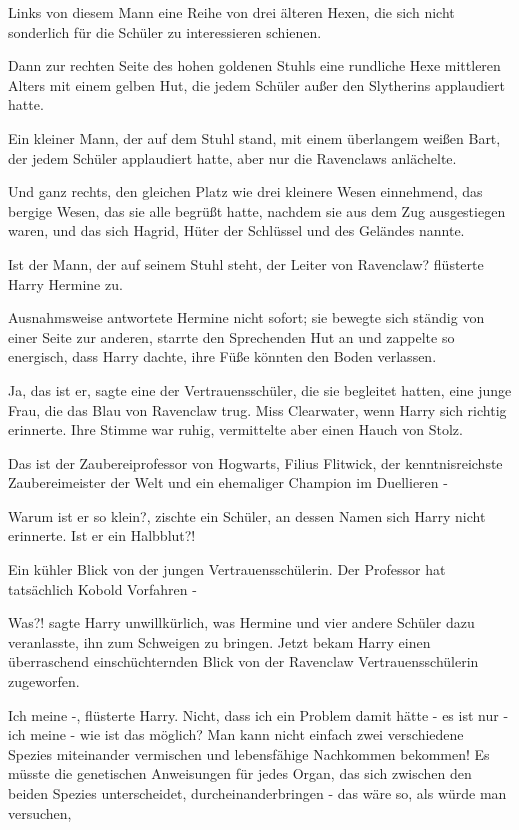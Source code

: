 Links von diesem Mann eine Reihe von drei älteren Hexen, die sich nicht
sonderlich für die Schüler zu interessieren schienen.

Dann zur rechten Seite des hohen goldenen Stuhls eine rundliche Hexe mittleren
Alters mit einem gelben Hut, die jedem Schüler außer den Slytherins applaudiert
hatte.

Ein kleiner Mann, der auf dem Stuhl stand, mit einem überlangem weißen Bart, der
jedem Schüler applaudiert hatte, aber nur die Ravenclaws anlächelte.

Und ganz rechts, den gleichen Platz wie drei kleinere Wesen einnehmend, das
bergige Wesen, das sie alle begrüßt hatte, nachdem sie aus dem Zug ausgestiegen
waren, und das sich Hagrid, Hüter der Schlüssel und des Geländes nannte.

\glqq{}Ist der Mann, der auf seinem Stuhl steht, der Leiter von Ravenclaw?\grqq{}
flüsterte Harry Hermine zu.

Ausnahmsweise antwortete Hermine nicht sofort; sie bewegte sich ständig von
einer Seite zur anderen, starrte den Sprechenden Hut an und zappelte so
energisch, dass Harry dachte, ihre Füße könnten den Boden verlassen.

\glqq{}Ja, das ist er\grqq{}, sagte eine der Vertrauensschüler, die sie
begleitet hatten, eine junge Frau, die das Blau von Ravenclaw trug. Miss
Clearwater, wenn Harry sich richtig erinnerte. Ihre Stimme war ruhig,
vermittelte aber einen Hauch von Stolz.

\glqq{}Das ist der Zaubereiprofessor von Hogwarts, Filius Flitwick, der
kenntnisreichste Zaubereimeister der Welt und ein ehemaliger Champion im
Duellieren -\grqq{}

\glqq{}Warum ist er so klein?\grqq{}, zischte ein Schüler, an dessen Namen sich
Harry nicht erinnerte. \glqq{}Ist er ein Halbblut?!\grqq{}

Ein kühler Blick von der jungen Vertrauensschülerin. \glqq{}Der Professor hat
tatsächlich Kobold Vorfahren -\grqq{}

\glqq{}Was?!\grqq{} sagte Harry unwillkürlich, was Hermine und vier andere
Schüler dazu veranlasste, ihn zum Schweigen zu bringen. Jetzt bekam Harry einen
überraschend einschüchternden Blick von der Ravenclaw Vertrauensschülerin
zugeworfen.

\glqq{}Ich meine -\grqq{}, flüsterte Harry. \glqq{}Nicht, dass ich ein Problem
damit hätte - es ist nur - ich meine - wie ist das möglich? Man kann nicht
einfach zwei verschiedene Spezies miteinander vermischen und lebensfähige
Nachkommen bekommen! Es müsste die genetischen Anweisungen für jedes Organ, das
sich zwischen den beiden Spezies unterscheidet, durcheinanderbringen - das wäre
so, als würde man versuchen,\grqq{}

